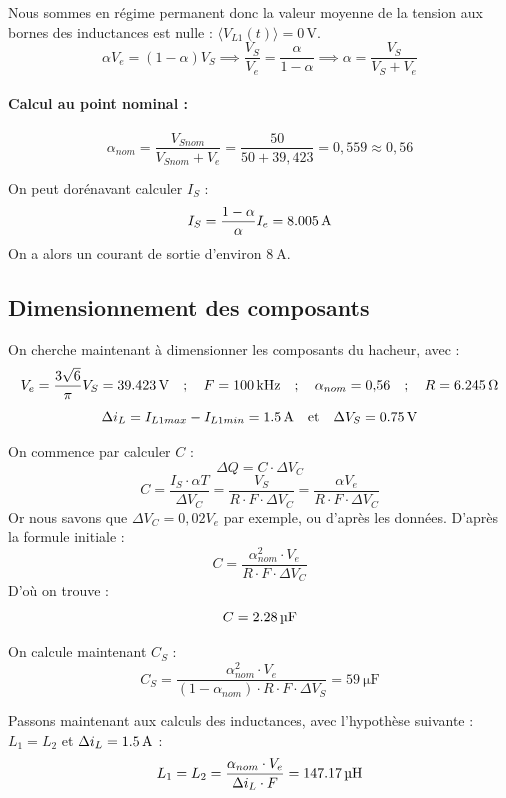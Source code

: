         Nous sommes en régime permanent donc la valeur moyenne de la tension aux bornes des inductances est nulle : $\langle V_{L1}(t) \rangle = 0\,\text{V}$.
        $$\alpha V_e = (1-\alpha)V_S \implies \frac{V_S}{V_e} = \frac{\alpha}{1-\alpha} \implies \alpha = \frac{V_S}{V_S+V_e}$$

        \paragraph{Calcul au point nominal :}
        $$\alpha_{nom} = \frac{V_{Snom}}{V_{Snom}+V_e} = \frac{50}{50+39{,}423} = 0{,}559 \approx 0{,}56$$

        On peut dorénavant calculer $I_S$ :
        $$I_S = \frac{1-\alpha}{\alpha} I_e = \SI{8{,}005}{\ampere}$$
        On a alors un courant de sortie d'environ $\SI{8}{\ampere}$.

        \subsection{Dimensionnement des composants}
        On cherche maintenant à dimensionner les composants du hacheur, avec :
        $$V_e = \frac{3\sqrt{6}}{\pi} V_S = \SI{39{,}423}{\volt} \quad;\quad F = \SI{100}{\kilo\hertz} \quad;\quad \alpha_{nom} = 0{,}56 \quad;\quad R = \SI{6{,}245}{\ohm}$$
        $$\Delta i_L = I_{L1max} - I_{L1min} = \SI{1{,}5}{\ampere} \quad\text{et}\quad \Delta V_S = \SI{0{,}75}{\volt}$$

        On commence par calculer $C$ :
        $$\Delta Q = C \cdot \Delta V_C$$
        $$C = \frac{I_S \cdot \alpha T}{\Delta V_C} = \frac{V_S}{R \cdot F \cdot \Delta V_C} = \frac{\alpha V_e}{R \cdot F \cdot \Delta V_C}$$
        Or nous savons que $\Delta V_C = 0{,}02 V_e$ par exemple, ou d'après les données. D'après la formule initiale :
        $$C = \frac{\alpha_{nom}^2 \cdot V_e}{R \cdot F \cdot \Delta V_C}$$
        D'où on trouve :
        $$C = \SI{2{,}28}{\micro\farad}$$

        On calcule maintenant $C_S$ :
        $$C_S = \frac{\alpha_{nom}^2 \cdot V_e}{(1-\alpha_{nom}) \cdot R \cdot F \cdot \Delta V_S} = \SI{59}{\micro\farad}$$

        Passons maintenant aux calculs des inductances, avec l'hypothèse suivante : $L_1 = L_2$ et $\Delta i_L = \SI{1{,}5}{\ampere}$ :
        $$L_1 = L_2 = \frac{\alpha_{nom} \cdot V_e}{\Delta i_L \cdot F} = \SI{147{,}17}{\micro\henry}$$

